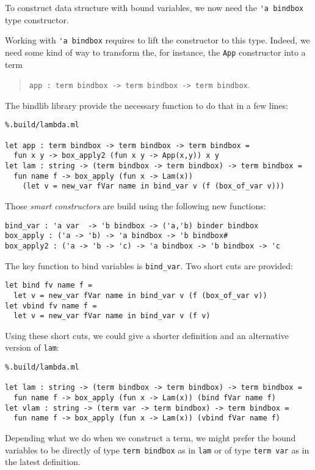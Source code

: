 \documentclass[11pt]{article}
\begin{document}
To construct data structure with bound variables, we now need the
\verb!'a bindbox! type constructor.

Working with \verb!'a bindbox! requires to lift the constructor to
this type. Indeed, we need some kind of way to transform the, for instance,
the \verb!App! constructor into a term
\begin{quote}
  \verb!app : term bindbox -> term bindbox -> term bindbox!.
\end{quote}
The bindlib library
provide the necessary function to do that in a few lines:

\begin{lstlisting}%.build/lambda.ml

let app : term bindbox -> term bindbox -> term bindbox =
  fun x y -> box_apply2 (fun x y -> App(x,y)) x y
let lam : string -> (term bindbox -> term bindbox) -> term bindbox =
  fun name f -> box_apply (fun x -> Lam(x))
    (let v = new_var fVar name in bind_var v (f (box_of_var v)))
\end{lstlisting}

Those \emph{smart constructors} are build using the following new functions:
\begin{lstlisting}
bind_var : 'a var  -> 'b bindbox -> ('a,'b) binder bindbox
box_apply : ('a -> 'b) -> 'a bindbox -> 'b bindbox#
box_apply2 : ('a -> 'b -> 'c) -> 'a bindbox -> 'b bindbox -> 'c
\end{lstlisting}

The key function to bind variables is \verb#bind_var#. Two short cuts
are provided:
\begin{lstlisting}
let bind fv name f =
  let v = new_var fVar name in bind_var v (f (box_of_var v))
let vbind fv name f =
  let v = new_var fVar name in bind_var v (f v)
\end{lstlisting}

Using these short cuts, we could give a shorter definition and an
alternative version of \verb#lam#:

\begin{lstlisting}%.build/lambda.ml

let lam : string -> (term bindbox -> term bindbox) -> term bindbox =
  fun name f -> box_apply (fun x -> Lam(x)) (bind fVar name f)
let vlam : string -> (term var -> term bindbox) -> term bindbox =
  fun name f -> box_apply (fun x -> Lam(x)) (vbind fVar name f)
\end{lstlisting}

Depending what we do when we construct a term, we might prefer
the bound variables to be directly of type \verb#term bindbox# as in
\verb#lam# or of type \verb#term var# as in the latest definition.
\end{document}

